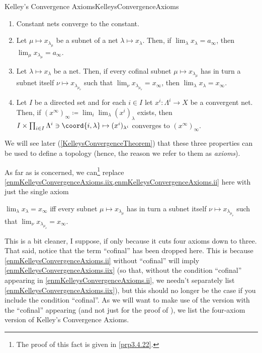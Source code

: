\begin{thm}{Kelley's Convergence Axioms}{KelleysConvergenceAxioms}
\begin{enumerate}
\item \label{enmKelleysConvergenceAxioms.i}Constant nets converge to the constant.
\item \label{enmKelleysConvergenceAxioms.iix}Let $\mu \mapsto x_{\lambda _\mu}$ be a subnet of a net $\lambda \mapsto x_\lambda$.  Then, if $\lim _{\lambda}x_{\lambda}=a_{\infty}$, then $\lim _{\mu}x_{\lambda _{\mu}}=a_{\infty}$.
\item \label{enmKelleysConvergenceAxioms.ii}Let $\lambda \mapsto x_{\lambda}$ be a net.  Then, if every cofinal subnet $\mu \mapsto x_{\lambda _\mu}$ has in turn a subnet itself $\nu \mapsto x_{\lambda _{\mu _\nu}}$ such that $\lim _\nu x_{\lambda _{\mu _\nu}}=x_\infty$, then $\lim _\lambda x_\lambda =x_\infty$.
\item \label{enmKelleysConvergenceAxioms.iii}Let $I$ be a directed set and for each $i\in I$ let $x^i:\Lambda ^i\rightarrow X$ be a convergent net.  Then, if $(x^\infty )_\infty \coloneqq \lim _i\lim _\lambda (x^i)_\lambda$ exists, then $I\times \prod _{i\in I}\Lambda ^i\ni \coord{i,\lambda}\mapsto (x^i)_{\lambda ^i}$ converges to $(x^\infty )_\infty$.
\end{enumerate}
\begin{rmk}
We will see later (\cref{KelleysConvergenceTheorem}) that these three properties can be used to define a topology (hence, the reason we refer to them as \emph{axioms}).
\end{rmk}
\begin{rmk}
As far as  is concerned, we can\footnote{The proof of this fact is given in \cref{prp3.4.22}.} replace \cref{enmKelleysConvergenceAxioms.iix,enmKelleysConvergenceAxioms.ii} here with just the single axiom
\begin{textequation}
$\lim _{\lambda}x_{\lambda}=x_{\infty}$ iff every subnet $\mu \mapsto x_{\lambda _\mu}$ has in turn a subnet itself $\nu \mapsto x_{\lambda _{\mu _\nu}}$ such that $\lim _\nu x_{\lambda _{\mu _\nu}}=x_\infty$.
\end{textequation}
This is a bit cleaner, I suppose, if only because it cuts four axioms down to three.  That said, notice that the term ``cofinal'' has been dropped here.  This is because \cref{enmKelleysConvergenceAxioms.ii} without ``cofinal'' will imply \cref{enmKelleysConvergenceAxioms.iix} (so that, without the condition ``cofinal'' appearing in \cref{enmKelleysConvergenceAxioms.ii}, we needn't separately list \cref{enmKelleysConvergenceAxioms.iix}), but this should no longer be the case if you include the condition ``cofinal''.  As we will want to make use of the version with the ``cofinal'' appearing (and not just for the proof of ), we list the four-axiom version of Kelley's Convergence Axioms.
\end{rmk}
\end{thm}
